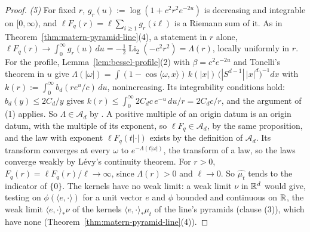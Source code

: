 \begin{proof}
\emph{(5)} For fixed $r$, $g_r(u) := \log(1 + c^2r^2e^{-2u})$ is decreasing and integrable on
$[0, \infty)$, and $\ell F_q(r) = \ell\sum_{i \ge 1}g_r(i\ell)$ is a Riemann sum of it. As in
Theorem~\ref{thm:matern-pyramid-line}(4), a statement in $r$ alone, $\ell F_q(r) \to \int_0^\infty
g_r(u)\,du = -\tfrac12\operatorname{Li}_2(-c^2r^2) = \Lambda(r)$, locally uniformly in $r$. For the
profile, Lemma~\ref{lem:bessel-profile}(2) with $\beta = c^2e^{-2u}$ and Tonelli's theorem in $u$
give $\Lambda(|\omega|) = \int(1 - \cos\langle\omega, x\rangle)\,k(|x|)\,
\bigl(|S^{d-1}|\,|x|^d\bigr)^{-1}dx$ with $k(r) := \int_0^\infty b_d(re^u/c)\,du$, nonincreasing.
Its integrability conditions hold: $b_d(y) \le 2C_d/y$ gives
$k(r) \le \int_0^\infty 2C_dc\,e^{-u}\,du/r = 2C_dc/r$, and the argument of (1) applies. So
$\Lambda \in \mathcal{A}_d$ by
. A positive multiple of an origin datum
is an origin datum, with the multiple of its exponent, so $\ell F_q \in \mathcal{A}_d$, by the same
proposition, and the law with exponent $\ell F_q(t|\cdot|)$ exists by the definition of
$\mathcal{A}_d$. Its transform converges at every $\omega$ to $e^{-\Lambda(t|\omega|)}$, the transform
of a law, so the laws converge weakly by Lévy's continuity theorem. For $r > 0$,
$F_q(r) = \ell F_q(r)/\ell \to \infty$, since $\Lambda(r) > 0$ and $\ell \to 0$. So
$\widehat{\mu_t}$ tends to the indicator of $\{0\}$.
The kernels have no weak limit: a weak limit $\nu$ in $\mathbb{R}^d$ would give, testing on
$\phi(\langle e, \cdot\rangle)$ for a unit vector $e$ and $\phi$ bounded and continuous on $\mathbb{R}$,
the weak limit $\langle e, \cdot\rangle_*\nu$ of the kernels $\langle e, \cdot\rangle_*\mu_t$ of
the line's \Matern{} pyramids (clause (3)), which have none
(Theorem~\ref{thm:matern-pyramid-line}(4)).
\end{proof}

